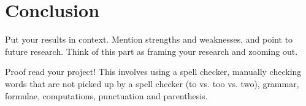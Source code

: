 \documentclass[UKenglish,bachelor]{uiomaster}  %
\begin{document}
\section{Conclusion}  
Put your results in context. Mention strengths and weaknesses, and point to future research. Think of this part as framing your research and zooming out.

Proof read your project! This involves using a spell checker, manually checking words that are not picked up by a spell checker (to vs. too vs. two), grammar, formulae, computations, punctuation and parenthesis.
\printbibliography{}
\end{document}
